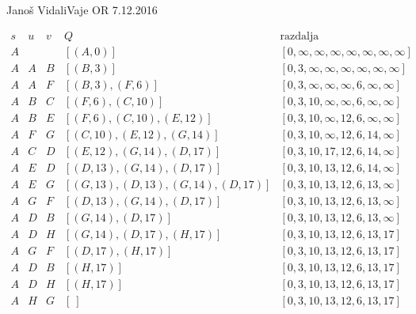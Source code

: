 \begin{naloga}{Janoš Vidali}{Vaje OR 7.12.2016}
\begin{odgovor}
\begin{tabela}
$$
\begin{array}{c|c|c|c|c}
s & u & v & Q & \text{razdalja} \\ \hline
A &   &   & [(A,0)]  & [0, \infty, \infty, \infty, \infty, \infty, \infty, \infty] \\
A & A  &  B & [(B, 3)]  & [0, 3, \infty, \infty, \infty, \infty, \infty, \infty] \\
A & A  &  F & [(B, 3), (F, 6)]  & [0, 3, \infty, \infty, \infty, 6, \infty, \infty] \\
A & B  & C & [(F, 6), (C, 10)]  & [0, 3, 10, \infty, \infty, 6, \infty, \infty] \\
A & B  & E & [(F, 6), (C, 10), (E, 12)]  & [0, 3, 10, \infty, 12, 6, \infty, \infty] \\
A & F  & G & [(C, 10), (E, 12), (G, 14)]  & [0, 3, 10, \infty, 12, 6, 14, \infty] \\
A & C  & D & [(E, 12), (G, 14), (D, 17)]  & [0, 3, 10, 17, 12, 6, 14, \infty] \\
A & E  & D & [(D, 13), (G, 14), (D, 17)]  & [0, 3, 10, 13, 12, 6, 14, \infty] \\
A & E  & G & [(G, 13), (D, 13), (G, 14), (D, 17)]  & [0, 3, 10, 13, 12, 6, 13, \infty] \\
A & G  & F & [(D, 13), (G, 14), (D, 17)]  & [0, 3, 10, 13, 12, 6, 13, \infty] \\
A & D  & B & [(G, 14), (D, 17)]  & [0, 3, 10, 13, 12, 6, 13, \infty] \\
A & D  & H & [(G, 14), (D, 17), (H, 17)]  & [0, 3, 10, 13, 12, 6, 13, 17] \\
A & G  & F & [(D, 17), (H, 17)]  & [0, 3, 10, 13, 12, 6, 13, 17] \\
A & D & B & [(H, 17)]  & [0, 3, 10, 13, 12, 6, 13, 17] \\
A & D & H & [(H, 17)]  & [0, 3, 10, 13, 12, 6, 13, 17] \\
A & H & G & [\ ]  & [0, 3, 10, 13, 12, 6, 13, 17] \\

\end{array}
$$
\end{tabela}


\end{odgovor}
\end{naloga}
